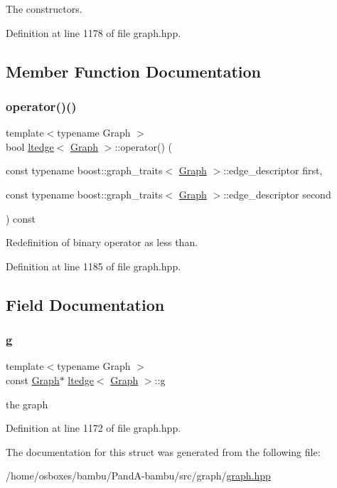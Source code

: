 The constructors. 



Definition at line 1178 of file graph.\+hpp.



\subsection{Member Function Documentation}
\mbox{\label{structltedge_a3bdba37318ae2ef9df726309ba302c65}} 
\subsubsection{\texorpdfstring{operator()()}{operator()()}}
{\footnotesize\ttfamily template$<$typename Graph $>$ \\
bool \hyperlink{structltedge}{ltedge}$<$ \hyperlink{structGraph}{Graph} $>$\+::operator() (\begin{DoxyParamCaption}\item[{const typename boost\+::graph\+\_\+traits$<$ \hyperlink{structGraph}{Graph} $>$\+::edge\+\_\+descriptor}]{first,  }\item[{const typename boost\+::graph\+\_\+traits$<$ \hyperlink{structGraph}{Graph} $>$\+::edge\+\_\+descriptor}]{second }\end{DoxyParamCaption}) const\hspace{0.3cm}{\ttfamily [inline]}}



Redefinition of binary operator as less than. 



Definition at line 1185 of file graph.\+hpp.



\subsection{Field Documentation}
\mbox{\label{structltedge_a05067d29c70c08f2359e58c175ab68b8}} 
\subsubsection{\texorpdfstring{g}{g}}
{\footnotesize\ttfamily template$<$typename Graph $>$ \\
const \hyperlink{structGraph}{Graph}$\ast$ \hyperlink{structltedge}{ltedge}$<$ \hyperlink{structGraph}{Graph} $>$\+::g\hspace{0.3cm}{\ttfamily [private]}}



the graph 



Definition at line 1172 of file graph.\+hpp.



The documentation for this struct was generated from the following file\+:\begin{DoxyCompactItemize}
\item 
/home/osboxes/bambu/\+Pand\+A-\/bambu/src/graph/\hyperlink{graph_8hpp}{graph.\+hpp}\end{DoxyCompactItemize}
